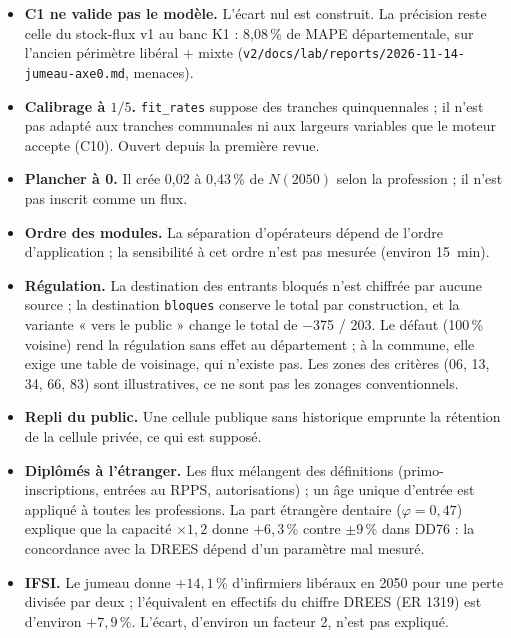 \begin{itemize}
  \item \textbf{C1 ne valide pas le modèle.} L'écart nul est construit. La précision reste celle du stock-flux v1
        au banc K1 : 8,08\mesure{}\,\% de MAPE départementale, sur l'ancien périmètre libéral + mixte
        (\texttt{v2/docs/lab/reports/2026-11-14-jumeau-axe0.md}, menaces).
  \item \textbf{Calibrage à $1/5$.} \texttt{fit\_rates} suppose des tranches quinquennales ; il n'est pas adapté
        aux tranches communales ni aux largeurs variables que le moteur accepte (C10). Ouvert depuis la première
        revue.
  \item \textbf{Plancher à 0.} Il crée 0,02 à 0,43\mesure{}\,\% de $N(2050)$ selon la profession ; il n'est pas
        inscrit comme un flux.
  \item \textbf{Ordre des modules.} La séparation d'opérateurs dépend de l'ordre d'application ; la sensibilité
        à cet ordre n'est pas mesurée (environ 15\suppose{}~min).
  \item \textbf{Régulation.} La destination des entrants bloqués n'est chiffrée par aucune source ; la
        destination \texttt{bloques} conserve le total par construction, et la variante « vers le public »
        change le total de \num{-375} / \num{+203}\mesure{}. Le défaut (100\,\% voisine) rend la régulation sans
        effet au département ; à la commune, elle exige une table de voisinage, qui n'existe pas. Les zones des
        critères (06, 13, 34, 66, 83) sont illustratives, ce ne sont pas les zonages conventionnels.
  \item \textbf{Repli du public.} Une cellule publique sans historique emprunte la rétention de la cellule privée,
        ce qui est supposé\suppose{}.
  \item \textbf{Diplômés à l'étranger.} Les flux mélangent des définitions (primo-inscriptions, entrées au
        RPPS, autorisations) ; un âge unique d'entrée est appliqué à toutes les professions. La part étrangère
        dentaire ($\varphi = 0{,}47$\mesure{}) explique que la capacité $\times 1{,}2$ donne $+6{,}3$\,\% contre
        $\pm 9$\,\% dans DD76 : la concordance avec la DREES dépend d'un paramètre mal mesuré.
  \item \textbf{IFSI.} Le jumeau donne $+14{,}1$\mesure{}\,\% d'infirmiers libéraux en 2050 pour une perte
        divisée par deux ; l'équivalent en effectifs du chiffre DREES (ER 1319) est d'environ
        $+7{,}9$\derive{}\,\%. L'écart, d'environ un facteur 2, n'est pas expliqué.

\end{itemize}
